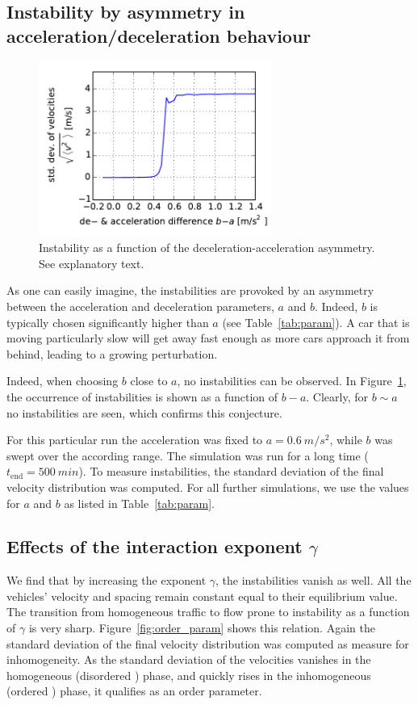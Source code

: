 \subsection{Instability by asymmetry in acceleration/deceleration behaviour}
\label{sec:asymm}

\begin{figure}
    \centering
    \includegraphics[width=3in]{../img/order_parameter_delta_acceleration.pdf}
    \caption{Instability as a function of the deceleration-acceleration asymmetry. See explanatory text.}
    \label{fig:order_parameter_delta_acceleration}
\end{figure}
As one can easily imagine, the instabilities are provoked by an asymmetry between the acceleration and deceleration parameters, $a$ and $b$. Indeed, $b$ is typically chosen significantly higher than $a$ (see Table~\ref{tab:param}). A car that is moving particularly slow will get away fast enough as more cars approach it from behind, leading to a growing perturbation.

Indeed, when choosing $b$ close to $a$, no instabilities can be observed. In Figure~\ref{fig:order_parameter_delta_acceleration}, the occurrence of instabilities is shown as a function of $b-a$. Clearly, for $b\sim a$ no instabilities are seen, which confirms this conjecture.

 For this particular run the acceleration was fixed to $a=\SI{0.6}{m/s^2}$, while $b$ was swept over the according range. The simulation was run for a long time ($t_\mathrm{end} = \SI{500}{min}$). To measure instabilities, the standard deviation of the final velocity distribution was computed. For all further simulations, we use the values for $a$ and $b$ as listed in Table~\ref{tab:param}.

\subsection{Effects of the interaction exponent $\gamma$}
We find that by increasing the exponent $\gamma$, the instabilities vanish as well. All the vehicles' velocity and spacing remain constant equal to their equilibrium value. The transition from homogeneous traffic to flow prone to instability as a function of $\gamma$ is very sharp. Figure~\ref{fig:order_param} shows this relation. Again the standard deviation of the final velocity distribution was computed as measure for inhomogeneity. As the standard deviation of the velocities vanishes in the homogeneous (disordered ) phase, and quickly rises in the inhomogeneous (ordered ) phase, it qualifies as an order parameter.

